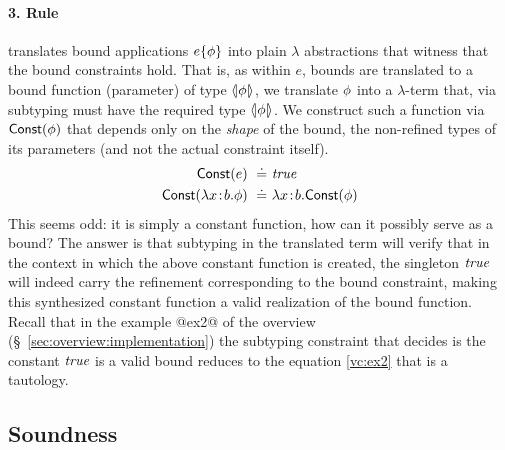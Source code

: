 \paragraph{3. Rule~\txCApp} translates bound applications
$ e \{ \phi \} $ into plain $\lambda$
abstractions that witness that the bound constraints
hold.
%
That is, as within $e$, bounds are translated to a bound
function (parameter) of type $\langle\!| \phi |\!\rangle$, we
translate $\phi$ into a $\lambda$-term that, via
subtyping must have the required type $\langle\!| \phi |\!\rangle$.
%
We construct such a function via $\mathsf{Const}(\phi)$
that depends only on the \emph{shape} of the bound,
\ie the non-refined types of its parameters (and not
the actual constraint itself).
\begin{align*}
\mathsf{Const}(e) \ \doteq\  & \textit{true} \\
\mathsf{Const}(\lambda {x\!:\!b}. \phi) \ \doteq\  &  \lambda {x\!:\!b}. \mathsf{Const}(\phi)
\end{align*}
%
This seems odd: it is simply a constant function, how
can it possibly serve as a bound? The answer is that
subtyping in the translated \corelan term will verify
that in the context in which the above constant function
is created, the singleton $\textit{true}$ will indeed carry
the refinement corresponding to the bound constraint,
making this synthesized constant function a valid
realization of the bound function.
%
Recall that in the example @ex2@ of the overview (\S~\ref{sec:overview:implementation})
the subtyping constraint that decides is the constant $\textit{true}$
is a valid bound reduces to the equation \ref{vc:ex2}
that is a tautology.

\subsection{Soundness}\label{sec:soundness}

